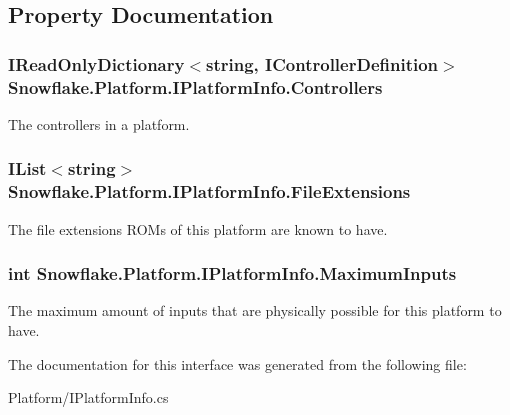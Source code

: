 \subsection{Property Documentation}
\hypertarget{interface_snowflake_1_1_platform_1_1_i_platform_info_a1151f29fd2b955e694257a3ea83b19eb}{}
\subsubsection[{Controllers}]{\setlength{\rightskip}{0pt plus 5cm}I\+Read\+Only\+Dictionary$<$string, {\bf I\+Controller\+Definition}$>$ Snowflake.\+Platform.\+I\+Platform\+Info.\+Controllers\hspace{0.3cm}{\ttfamily [get]}}\label{interface_snowflake_1_1_platform_1_1_i_platform_info_a1151f29fd2b955e694257a3ea83b19eb}


The controllers in a platform. 

\hypertarget{interface_snowflake_1_1_platform_1_1_i_platform_info_a2e12201a96a5804f7f97dc3239d6a4d3}{}
\subsubsection[{File\+Extensions}]{\setlength{\rightskip}{0pt plus 5cm}I\+List$<$string$>$ Snowflake.\+Platform.\+I\+Platform\+Info.\+File\+Extensions\hspace{0.3cm}{\ttfamily [get]}}\label{interface_snowflake_1_1_platform_1_1_i_platform_info_a2e12201a96a5804f7f97dc3239d6a4d3}


The file extensions R\+O\+Ms of this platform are known to have. 

\hypertarget{interface_snowflake_1_1_platform_1_1_i_platform_info_a3d087c38d145982e8fb26d5adbaaf545}{}
\subsubsection[{Maximum\+Inputs}]{\setlength{\rightskip}{0pt plus 5cm}int Snowflake.\+Platform.\+I\+Platform\+Info.\+Maximum\+Inputs\hspace{0.3cm}{\ttfamily [get]}}\label{interface_snowflake_1_1_platform_1_1_i_platform_info_a3d087c38d145982e8fb26d5adbaaf545}


The maximum amount of inputs that are physically possible for this platform to have. 



The documentation for this interface was generated from the following file\+:\begin{DoxyCompactItemize}
\item 
Platform/I\+Platform\+Info.\+cs\end{DoxyCompactItemize}
